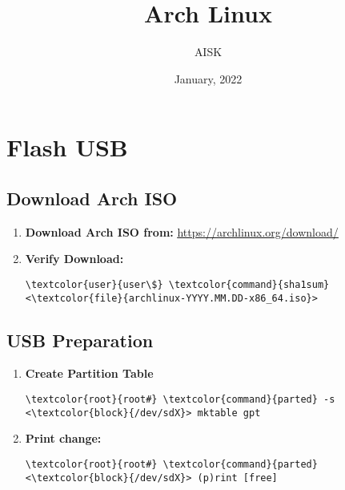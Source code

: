 \documentclass[10pt, a4paper, onecolumn, openany]{book} %
\title{\textbf{Arch Linux}}
\author{AISK}
\date{January, 2022}
\begin{document}
\maketitle
\tableofcontents

\chapter{Flash USB}
\section{Download Arch ISO}
\begin{enumerate}
    \item \textbf{Download Arch ISO from:}
\newline \underline{\href{https://archlinux.org/download/}{https://archlinux.org/download/}}
    \item \textbf{Verify Download:}
\begin{Verbatim}[commandchars=\\\{\}]
\textcolor{user}{user\$} \textcolor{command}{sha1sum} <\textcolor{file}{archlinux-YYYY.MM.DD-x86_64.iso}>
\end{Verbatim}
\end{enumerate}
\section{USB Preparation}
\begin{enumerate}
    \item \textbf{Create Partition Table}
\begin{Verbatim}[commandchars=\\\{\}]
\textcolor{root}{root#} \textcolor{command}{parted} -s <\textcolor{block}{/dev/sdX}> mktable gpt
\end{Verbatim}
    \item \textbf{Print change:}
\begin{Verbatim}[commandchars=\\\{\}]
\textcolor{root}{root#} \textcolor{command}{parted} <\textcolor{block}{/dev/sdX}> (p)rint [free]
\end{Verbatim}
\end{enumerate}
\end{document}
